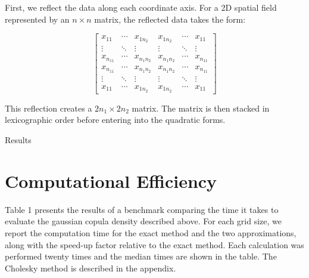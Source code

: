 \documentclass[
  12pt]{article}
\begin{document}
First, we reflect the data along each coordinate axis. For a 2D spatial
field represented by an \(n \times n\) matrix, the reflected data takes
the form:

\[
\begin{bmatrix}
x_{11} & \cdots & x_{1n_2} & x_{1n_2} & \cdots & x_{11} \\
\vdots & \ddots & \vdots & \vdots & \ddots & \vdots \\
x_{n_11} & \cdots & x_{n_1n_2} & x_{n_1n_2} & \cdots & x_{n_11} \\
x_{n_11} & \cdots & x_{n_1n_2} & x_{n_1n_2} & \cdots & x_{n_11} \\
\vdots & \ddots & \vdots & \vdots & \ddots & \vdots \\
x_{11} & \cdots & x_{1n_2} & x_{1n_2} & \cdots & x_{11}
\end{bmatrix}
\]

This reflection creates a \(2n_1 \times 2n_2\) matrix. The matrix is
then stacked in lexicographic order before entering into the quadratic
forms.

Results

\section{Computational Efficiency}\label{computational-efficiency}

Table 1 presents the results of a benchmark comparing the time it takes
to evaluate the gaussian copula density described above. For each grid
size, we report the computation time for the exact method and the two
approximations, along with the speed-up factor relative to the exact
method. Each calculation was performed twenty times and the median times
are shown in the table. The Cholesky method is described in the
appendix.
\end{document}
